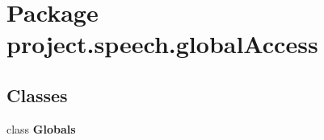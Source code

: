 \section{Package project.\+speech.\+global\+Access}
\label{namespaceproject_1_1speech_1_1global_access}
\subsection*{Classes}
\begin{DoxyCompactItemize}
\item 
class {\bf Globals}
\end{DoxyCompactItemize}
